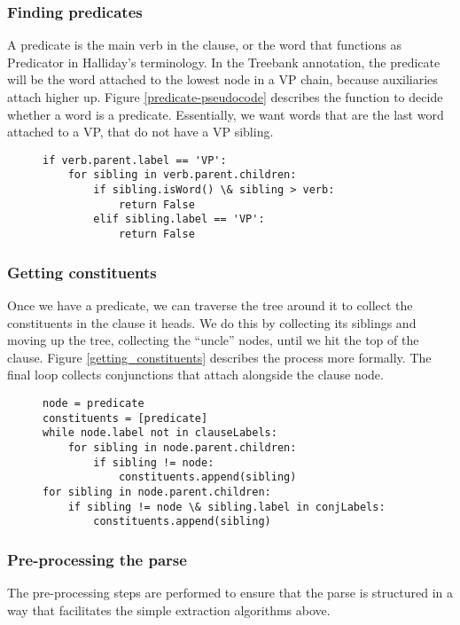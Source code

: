 \documentclass[11pt]{article}
\begin{document}
\subsubsection{Finding predicates}

A predicate is the main verb in the clause, or the word that functions as Predicator in Halliday's terminology. In the Treebank annotation, the predicate will be the word attached to the lowest node in a VP chain, because auxiliaries attach higher up. Figure \ref{predicate-pseudocode} describes the function to decide whether a word is a predicate. Essentially, we want words that are the last word attached to a VP, that do not have a VP sibling.

\begin{figure}
\begin{verbatim}
if verb.parent.label == 'VP':
    for sibling in verb.parent.children:
		if sibling.isWord() \& sibling > verb:
			return False
		elif sibling.label == 'VP':
			return False
\end{verbatim}
\end{figure}
\subsubsection{Getting constituents}

Once we have a predicate, we can traverse the tree around it to collect the constituents in the clause it heads. We do this by collecting its siblings and moving up the tree, collecting the ``uncle'' nodes, until we hit the top of the clause. Figure \ref{getting_constituents} describes the process more formally. The final loop collects conjunctions that attach alongside the clause node. 

\begin{figure}
\begin{verbatim}
node = predicate
constituents = [predicate]
while node.label not in clauseLabels:
	for sibling in node.parent.children:
		if sibling != node:
			constituents.append(sibling)
for sibling in node.parent.children:
	if sibling != node \& sibling.label in conjLabels:
		constituents.append(sibling)
\end{verbatim}
\end{figure}
\subsubsection{Pre-processing the parse}

The pre-processing steps are performed to ensure that the parse is structured in a way that facilitates the simple extraction algorithms above.
\end{document}
